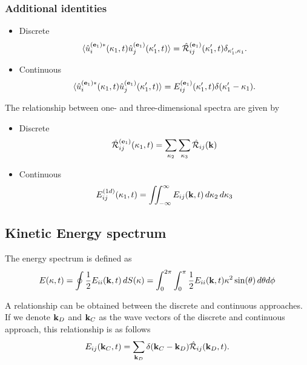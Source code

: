 \documentclass[oneside,a4paper,11pt]{report}
\newcommand{\tpvc}{\mathcal{R}} %
\newcommand{\est}{E}            %
\begin{document}
\subsubsection{Additional identities}
\begin{itemize}
\item Discrete
\begin{equation} 
\langle \hat{u}^{(\evec_1)*}_i(\kappa_1,t) \hat{u}^{(\evec_1)}_j(\kappa'_1,t) \rangle = \hat{\tpvc}^{(\evec_1)}_{ij}(\kappa'_1,t) \delta_{\kappa'_1,\kappa_1}.
\end{equation}
\item Continuous
\begin{equation} 
\langle \hat{u}^{(\mathbf{e}_1)*}_i(\kappa_1,t) \hat{u}^{(\mathbf{e}_1)}_j(\kappa'_1,t) \rangle = E^{(\mathbf{e}_1)}_{ij}(\kappa'_1,t)\delta(\kappa'_1 - \kappa_1).
\end{equation}
\end{itemize}

The relationship between one- and three-dimensional spectra are given by
\begin{itemize}
\item Discrete
\begin{equation}
\hat{\tpvc}_{ij}^{(\evec_1)}(\kappa_1,t) = \sum_{\kappa_2} \sum_{\kappa_3} \hat{\tpvc}_{ij} (\kvec)
\end{equation}
\item Continuous
\begin{equation}
\est_{ij}^{(1d)}(\kappa_1,t) = \iint_{-\infty}^{\infty} \est_{ij}(\kvec,t) \, d\kappa_2 \, d\kappa_3
\end{equation}
\end{itemize}

\subsection{Kinetic Energy spectrum}

The energy spectrum is defined as 
\begin{equation}
\est( \kappa, t ) = \oint \frac{1}{2} \est_{ii}( \kvec, t ) \, dS(\kappa) = \int_0^{2\pi} \int_0^\pi \frac{1}{2} \est_{ii}(\kvec, t) \kappa^2 \sin(\theta) \, d\theta d\phi
\end{equation}

A relationship can be obtained between the discrete and continuous approaches. If we denote $\mathbf{k}_D$ and $\mathbf{k}_C$ as the wave vectors of the discrete and continuous approach, this relationship is as follows
\begin{equation}
\label{eq:vst_discrete_continuous}
\est_{ij}(\kvec_C,t) = \sum_{\kvec_D} \delta(\kvec_C - \kvec_D) \hat{\tpvc}_{ij}(\kvec_D,t).
\end{equation}
\end{document}
